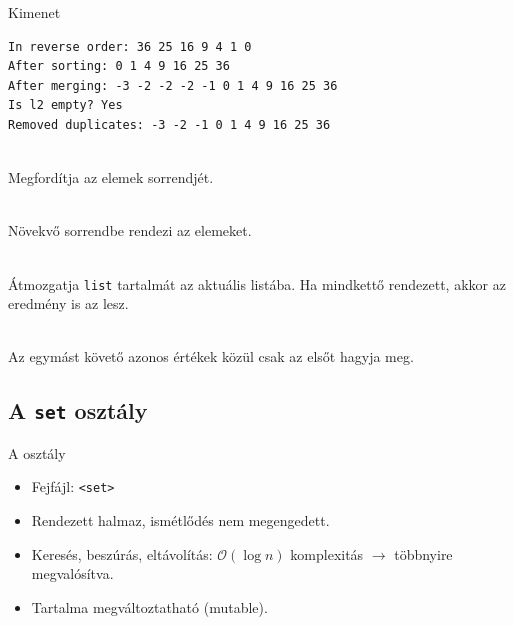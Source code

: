 \begin{frame}[fragile]
    \begin{block}{Kimenet}
        \small
        \vspace{-.4cm}
        \begin{verbatim}
In reverse order: 36 25 16 9 4 1 0 
After sorting: 0 1 4 9 16 25 36 
After merging: -3 -2 -2 -2 -1 0 1 4 9 16 25 36 
Is l2 empty? Yes
Removed duplicates: -3 -2 -1 0 1 4 9 16 25 36
\end{verbatim}
        \vspace{-.3cm}
    \end{block}
    \vfill
    \begin{description}[m]
        \small
        \item[\hiv{\href{https://en.cppreference.com/w/cpp/container/list/reverse}{\texttt{reverse()}}}] \hfill \\ Megfordítja az elemek sorrendjét.
        \item[\hiv{\href{https://en.cppreference.com/w/cpp/container/list/sort}{\texttt{sort()}}}] \hfill \\ Növekvő sorrendbe rendezi az elemeket.
        \item[\hiv{\href{https://en.cppreference.com/w/cpp/container/list/merge}{\texttt{merge(list)}}}] \hfill \\ Átmozgatja \texttt{list} tartalmát az aktuális listába. Ha mindkettő rendezett, akkor az eredmény is az lesz.
        \item[\hiv{\href{https://en.cppreference.com/w/cpp/container/list/unique}{\texttt{unique()}}}] \hfill \\ Az egymást követő azonos értékek közül csak az elsőt hagyja meg.
    \end{description}
\end{frame}

\subsection{A \texttt{set} osztály}

\begin{frame}
    A  osztály
    \begin{itemize}
        \item Fejfájl: \texttt{<set>}
        \item Rendezett halmaz, ismétlődés nem megengedett.
        \item Keresés, beszúrás, eltávolítás: $\mathcal{O}(\log{}n)$ komplexitás $\to$ többnyire  megvalósítva.
        \item Tartalma megváltoztatható (mutable).
    \end{itemize}
\end{frame}


